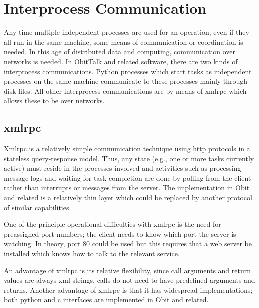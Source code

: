 \documentclass[11pt]{report}
\begin{document}
\section{Interprocess Communication}
Any time multiple independent processes are used for an operation,
even if they all run in the same machine, some means of communication
or coordination is needed.
In this age of distributed data and computing, communication over
networks is needed.
In ObitTalk and related software, there are two kinds of interprocess
communications.
Python processes which start tasks as independent processes on the same
machine communicate to these processes mainly through disk files.
All other interprocess communications are by means of xmlrpc which
allows these to be over networks.

\subsection{xmlrpc}
Xmlrpc is a relatively simple communication technique using http
protocols in a stateless query-response model.
Thus, any state (e.g., one or more tasks currently active) must reside in
the processes involved and activities such as processing message logs
and waiting for task completion are done by polling from the client
rather than interrupts or messages from the server.
The implementation in Obit and related is a relatively thin layer
which could be replaced by another protocol of similar capabilities.

One of the principle operational difficulties with xmlrpc is the need
for preassigned port numbers; the client needs to know which port the
server is watching.
In theory, port 80 could be used but this requires that a web server
be installed which knows how to talk to the relevant service.

An advantage of xmlrpc is its relative flexibility, since call
arguments and return values are always xml strings, calls do not need
to have predefined arguments and returns.
Another advantage of xmlrpc is that it has widespread implementations;
both python and c interfaces are implemented in Obit and related.
\end{document}
